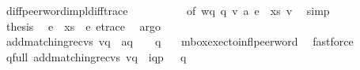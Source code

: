 \begin{isabellebody}
\ diff{\isacharunderscore}{\kern0pt}peer{\isacharunderscore}{\kern0pt}word{\isacharunderscore}{\kern0pt}impl{\isacharunderscore}{\kern0pt}diff{\isacharunderscore}{\kern0pt}trace\isanewline
\ \ \ \ \ \ \ \ \ \ {\isacharbrackleft}{\kern0pt}of\ {\isachardoublequoteopen}{\isacharquery}{\kern0pt}wq{\isachardoublequoteclose}\ q\ {\isachardoublequoteopen}{\isacharquery}{\kern0pt}v{\isacharprime}{\kern0pt}{\isachardoublequoteclose}\ a\ {\isachardoublequoteopen}{\isacharparenleft}{\kern0pt}e\ {\isasymsqdot}\ xs{\isacharparenright}{\kern0pt}{\isachardoublequoteclose}\ v{\isacharbrackright}{\kern0pt}\ \isamarkupfalse%
\ simp\isanewline
\ \ \ \ \ \ \isamarkupfalse%
\ \isamarkupfalse%
\ {\isacharquery}{\kern0pt}thesis\ \isamarkupfalse%
\ {\isacartoucheopen}{\isacharparenleft}{\kern0pt}e\ {\isasymsqdot}\ xs{\isacharparenright}{\kern0pt}{\isasymdown}\isactrlsub {\isacharbang}{\kern0pt}\ {\isacharequal}{\kern0pt}\ e{\isasymdown}\isactrlsub {\isacharbang}{\kern0pt}{\isacartoucheclose}\ e{\isacharunderscore}{\kern0pt}trace{}\ \isamarkupfalse%
\ argo\isanewline
\ \ \ \ \isamarkupfalse%
\isanewline
\ \ \isamarkupfalse%
\isanewline
\isanewline
\isanewline
\ \ \isamarkupfalse%
\ \isamarkupfalse%
\ {\isachardoublequoteopen}{\isacharparenleft}{\kern0pt}{\isacharparenleft}{\kern0pt}add{\isacharunderscore}{\kern0pt}matching{\isacharunderscore}{\kern0pt}recvs\ v{\isacharparenright}{\kern0pt}{\isasymdown}\isactrlsub q\ {\isacharat}{\kern0pt}\ {\isacharbrackleft}{\kern0pt}a{\isacharbrackright}{\kern0pt}{\isasymdown}\isactrlsub q\ {\isacharparenright}{\kern0pt}\ {\isasymin}\ {\isasymL}\isactrlsup {\isacharasterisk}{\kern0pt}\ q{\isachardoublequoteclose}\ \ \isamarkupfalse%
\ mbox{\isacharunderscore}{\kern0pt}exec{\isacharunderscore}{\kern0pt}to{\isacharunderscore}{\kern0pt}infl{\isacharunderscore}{\kern0pt}peer{\isacharunderscore}{\kern0pt}word\ \isamarkupfalse%
\ fastforce\isanewline
\ \ \isamarkupfalse%
\ \isamarkupfalse%
\ q{\isacharunderscore}{\kern0pt}full{\isacharcolon}{\kern0pt}\ {\isachardoublequoteopen}{\isacharparenleft}{\kern0pt}{\isacharparenleft}{\kern0pt}add{\isacharunderscore}{\kern0pt}matching{\isacharunderscore}{\kern0pt}recvs\ v{\isacharparenright}{\kern0pt}{\isasymdown}\isactrlsub q\ {\isacharat}{\kern0pt}\ {\isacharbrackleft}{\kern0pt}{\isacharbang}{\kern0pt}{\isasymlangle}{\isacharparenleft}{\kern0pt}i\isactrlbsup q{\isasymrightarrow}p\isactrlesup {\isacharparenright}{\kern0pt}{\isasymrangle}{\isacharbrackright}{\kern0pt}{\isacharparenright}{\kern0pt}\ {\isasymin}\ {\isasymL}\isactrlsup {\isacharasterisk}{\kern0pt}\ q{\isachardoublequoteclose}\ \isamarkupfalse%

\end{isabellebody}
